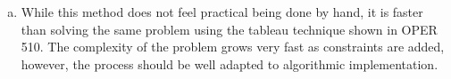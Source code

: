 \documentclass[12pt]{amsart}
\begin{document}
\begin{enumerate}[a.]
	\item 
	While this method does not feel practical being done by hand, 
	it is faster than solving the same problem using the tableau technique shown in OPER 510.
	The complexity of the problem grows very fast as constraints are added,
	however, the process should be well adapted to algorithmic implementation.
	
	
\end{enumerate}
\end{document}
